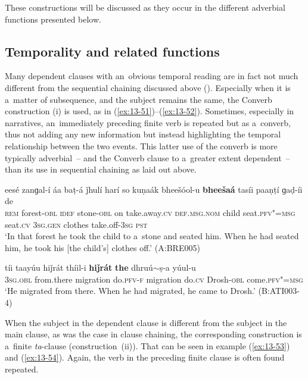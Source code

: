 These constructions will be discussed as they occur in the different adverbial functions presented below. 


\subsection{Temporality and related functions}
\label{subsec:13-4-1}

 Many dependent clauses with an~obvious temporal reading are in fact not much different from the sequential chaining discussed above (). Especially when it is a~matter of subsequence, and the subject remains the same, the Converb construction (i) is used, as in (\ref{ex:13-51})--(\ref{ex:13-52}). Sometimes, especially in narratives, an~immediately preceding finite verb is repeated but as a~converb, thus not adding any new information but instead highlighting the temporal relationship between the two events. This latter use of the converb is more typically adverbial~-- and the Converb clause to a~greater extent dependent~-- than its use in sequential chaining as laid out above.

\begin{exe}
\ex
\label{ex:13-51}
\gll eesé zanɡal-í áa baṭ-á ǰhulí harí so kuṇaák bheešóol-u \textbf{bheešaá} tasíi paaṇṭí ɡaḍ-íi de \\
\textsc{rem} forest-\textsc{obl} \textsc{idef} stone-\textsc{obl} on take.away.\textsc{cv}   \textsc{def.msg.nom} child seat.\textsc{pfv"=msg} seat.\textsc{cv} \textsc{3sg.gen} clothes take.off-\textsc{3sg} \textsc{pst}\\
\glt `In that forest he took the child to a~stone and seated him. When he had seated him, he took his [the child's] clothes off.' (A:BRE005)

\ex
\label{ex:13-52}
\gll tíi taayúu hiǰrát thíil-i \textbf{hiǰrát} \textbf{the} dhruú$\sim$ṣ-a yúul-u \\
\textsc{3sg.obl} from.there migration do.\textsc{pfv-f}    migration do.\textsc{cv} Drosh-\textsc{obl} come.\textsc{pfv"=msg} \\
\glt `He migrated from there. When he had migrated, he came to Drosh.' (B:ATI003-4) 
\end{exe}

When the subject in the dependent clause is different from the subject in the main clause, as was the case in clause chaining, the corresponding construction is a~finite \textit{ta}-clause (construction~(ii)). That can be seen in example (\ref{ex:13-53}) and (\ref{ex:13-54}). Again, the verb in the preceding finite clause is often found repeated.

